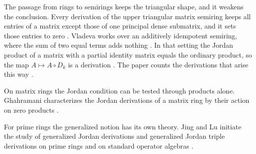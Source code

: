 The passage from rings to semirings keeps the triangular shape, and it weakens
the conclusion. %
Every derivation of the upper triangular matrix semiring
keeps all entries of a matrix except those of one principal dense submatrix,
and it sets those entries to zero
\cite[Theorem~1, p.~5]{Vladeva2018Semirings}. Vladeva works over an additively
idempotent semiring, where the sum of two equal terms adds nothing
\cite[Proposition~1, p.~3]{Vladeva2018Semirings}. In that setting the Jordan
product of a matrix with a partial identity matrix equals the ordinary product,
so the map $A\mapsto A\circ D_k$ is a derivation
\cite[Proposition~1, p.~3]{Vladeva2018Semirings}. The paper counts the
derivations that arise this way \cite[Theorem~1, p.~5]{Vladeva2018Semirings}.

On matrix rings the Jordan condition can be tested through products alone.
Ghahramani characterizes the Jordan derivations of a matrix ring by their action
on zero products \cite[Abstract]{Ghahramani2015ZeroJordan}.

For prime rings the generalized notion has its own theory. Jing and Lu initiate
the study of generalized Jordan derivations and generalized Jordan triple
derivations on prime rings and on standard operator algebras
\cite[Abstract, p.~605]{JingLu2003GeneralizedJordan}.

